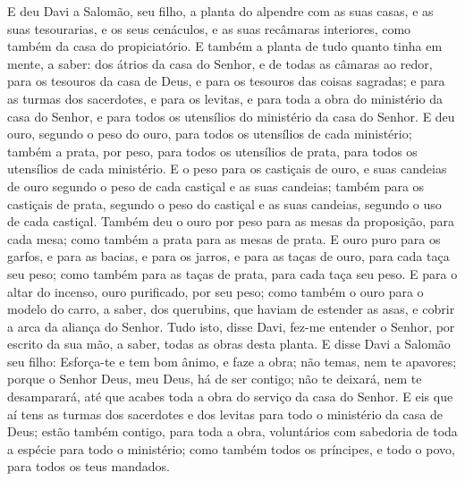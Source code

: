 E deu Davi a Salomão, seu filho, a planta do alpendre com as suas
casas, e as suas tesourarias, e os seus cenáculos, e as suas
recâmaras interiores, como também da casa do propiciatório. E
também a planta de tudo quanto tinha em mente, a saber: dos átrios
da casa do Senhor, e de todas as câmaras ao redor, para os tesouros
da casa de Deus, e para os tesouros das coisas sagradas; e
para as turmas dos sacerdotes, e para os levitas, e para toda a obra
do ministério da casa do Senhor, e para todos os utensílios do
ministério da casa do Senhor. E deu ouro, segundo o peso do
ouro, para todos os utensílios de cada ministério; também a prata,
por peso, para todos os utensílios de prata, para todos os
utensílios de cada ministério. E o peso para os castiçais de
ouro, e suas candeias de ouro segundo o peso de cada castiçal e as
suas candeias; também para os castiçais de prata, segundo o peso do
castiçal e as suas candeias, segundo o uso de cada castiçal.
Também deu o ouro por peso para as mesas da proposição, para
cada mesa; como também a prata para as mesas de prata. E ouro
puro para os garfos, e para as bacias, e para os jarros, e para as
taças de ouro, para cada taça seu peso; como também para as taças de
prata, para cada taça seu peso. E para o altar do incenso,
ouro purificado, por seu peso; como também o ouro para o modelo do
carro, a saber, dos querubins, que haviam de estender as asas, e
cobrir a arca da aliança do Senhor. Tudo isto, disse Davi,
fez-me entender o Senhor, por escrito da sua mão, a saber, todas as
obras desta planta. E disse Davi a Salomão seu filho:
Esforça-te e tem bom ânimo, e faze a obra; não temas, nem te
apavores; porque o Senhor Deus, meu Deus, há de ser contigo; não te
deixará, nem te desamparará, até que acabes toda a obra do serviço
da casa do Senhor. E eis que aí tens as turmas dos sacerdotes
e dos levitas para todo o ministério da casa de Deus; estão também
contigo, para toda a obra, voluntários com sabedoria de toda a
espécie para todo o ministério; como também todos os príncipes, e
todo o povo, para todos os teus mandados.

\medskip

